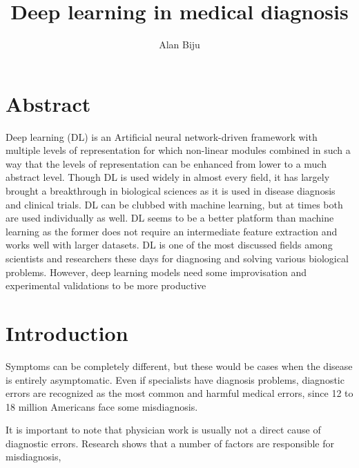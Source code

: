 \documentclass{article}
\begin{document}
\title{Deep learning in medical diagnosis }
\author{Alan Biju}


\maketitle


\section*{Abstract}

Deep learning (DL) is an Artificial neural network-driven framework with multiple levels of representation for which non-linear modules combined in such a way that the levels of representation can be enhanced from lower to a much abstract level. Though DL is used widely in almost every field, it has largely brought a breakthrough in biological sciences as it is used in disease diagnosis and clinical trials. DL can be clubbed with machine learning, but at times both are used individually as well. DL seems to be a better platform than machine learning as the former does not require an intermediate feature extraction and works well with larger datasets. DL is one of the most discussed fields among scientists and researchers these days for diagnosing and solving various biological problems. However, deep learning models need some improvisation and experimental validations to be more productive 


\section*{Introduction}
Symptoms can be completely different, but these would be cases when the disease is entirely asymptomatic. Even if specialists have diagnosis problems, diagnostic errors are recognized as the most common and harmful medical errors, since 12 to 18 million Americans face some misdiagnosis.

It is important to note that physician work is usually not a direct cause of diagnostic errors. Research shows that a number of factors are responsible for misdiagnosis,
\end{document}
